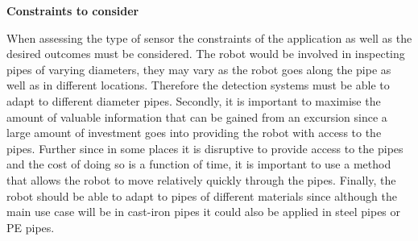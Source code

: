 \documentclass[11pt]{article}		%
\begin{document}
	        \textbf{Constraints to consider}
	        
	        When assessing the type of sensor the constraints of the application as well as the desired outcomes must be considered. 
	        The robot would be involved in inspecting pipes of varying diameters, they may vary as the robot goes along the pipe as well as in different locations. 
	        Therefore the detection systems must be able to adapt to different diameter pipes. 
	        Secondly, it is important to maximise the amount of valuable information that can be gained from an excursion since a large amount of investment goes into providing the robot with access to the pipes.
	        Further since in some places it is disruptive to provide access to the pipes and the cost of doing so is a function of time, it is important to use a method that allows the robot to move relatively quickly through the pipes. 
	        Finally, the robot should be able to adapt to pipes of different materials since although the main use case will be in cast-iron pipes it could also be applied in steel pipes or PE pipes.
	
\end{document}
